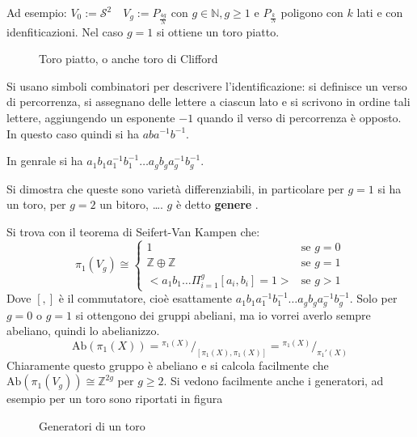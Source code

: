 \documentclass{article}
\newcommand{\Z}{\mathbb{Z}}
\newcommand{\Sph}[1][]{\mathcal{S}^#1}
\newcommand{\Ab}[1]{\mathrm{Ab}( #1 )}
\newcommand*\quot[2]{{^{\textstyle #1}\big/_{\textstyle #2}}}
\begin{document}
Ad esempio:
$ V_0 := \Sph{2} \quad V_g := P_{\frac{4g}{N}} \text{ con } g \in \mathbb{N}, g \geq 1 $ e $ P_{\frac{k}{N}} $ poligono con $ k $ lati e con idenfiticazioni.
Nel caso $ g = 1 $ si ottiene un toro piatto.
\begin{figure}[htbp]
  \centering
  \caption{Toro piatto, o anche toro di Clifford}
  \label{fig:lez3:clifford_torus}
\end{figure}
Si usano simboli combinatori per descrivere l'identificazione: si definisce un verso di percorrenza, si assegnano delle lettere a ciascun
lato e si scrivono in ordine tali lettere, aggiungendo un esponente $ -1 $ quando il verso di percorrenza è opposto. In questo caso quindi
si ha $ aba^{-1}b^{-1} $.

In genrale si ha $ a_1 b_1 a_1^{-1} b_1^{-1} \dots a_g b_g a_g^{-1} b_g^{-1} $.

Si dimostra che queste sono varietà differenziabili, in particolare per $ g = 1 $ si ha un toro, per $ g = 2 $ un bitoro, \dots. $ g $ è
detto \textbf{genere} .

Si trova con il teorema di Seifert-Van Kampen che:
\[
  \pi_1(V_g) \cong
  \begin{cases}
    1 & \text{se } g = 0 \\
    \Z \oplus \Z & \text{se } g = 1 \\
    < a_1 b_1 \dots \Pi_{i=1}^g [a_i,b_i] = 1 > & \text{se } g > 1
  \end{cases}
\]
Dove $ [,] $ è il commutatore, cioè esattamente $ a_1 b_1 a_1^{-1} b_1^{-1} \dots a_g b_g a_g^{-1} b_g^{-1} $.
Solo per $ g = 0 $ o $ g = 1 $ si ottengono dei gruppi abeliani, ma io vorrei averlo sempre abeliano, quindi lo abelianizzo.
\[
  \Ab{\pi_1(X)} = \quot{\pi_1(X)}{[\pi_1(X), \pi_1(X)]} = \quot{\pi_1(X)}{\pi_1'(X)}
\]
Chiaramente questo gruppo è abeliano e si calcola facilmente che $ \Ab{\pi_1(V_g)} \cong \Z^{2g} $ per $ g \geq 2 $.
Si vedono facilmente anche i generatori, ad esempio per un toro sono riportati in figura

\begin{figure}[htbp]
  \centering
  
  \caption{Generatori di un toro}
  \label{fig:lez3:torus_generators}
\end{figure}
\end{document}
